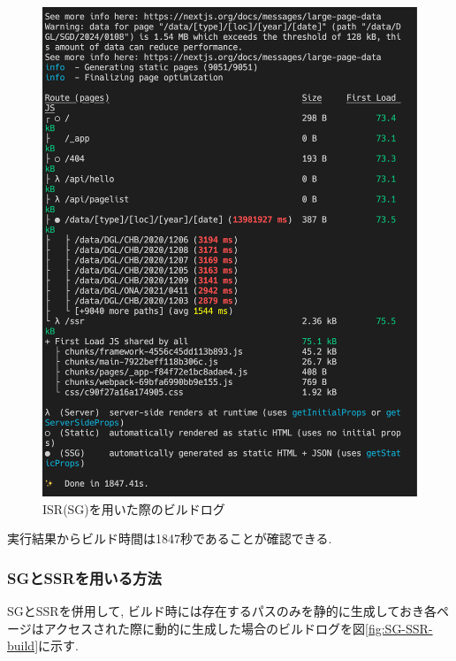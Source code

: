 \begin{figure}[htbp]
	\begin{center}
		\includegraphics[width=\linewidth]{ISR.png}
		\caption{ISR(SG)を用いた際のビルドログ}\label{fig:ISR-build}
	\end{center}
\end{figure}

実行結果からビルド時間は1847秒であることが確認できる.

\subsubsection{SGとSSRを用いる方法}
SGとSSRを併用して, ビルド時には存在するパスのみを静的に生成しておき各ページはアクセスされた際に動的に生成した場合のビルドログを図\ref{fig:SG-SSR-build}に示す.

